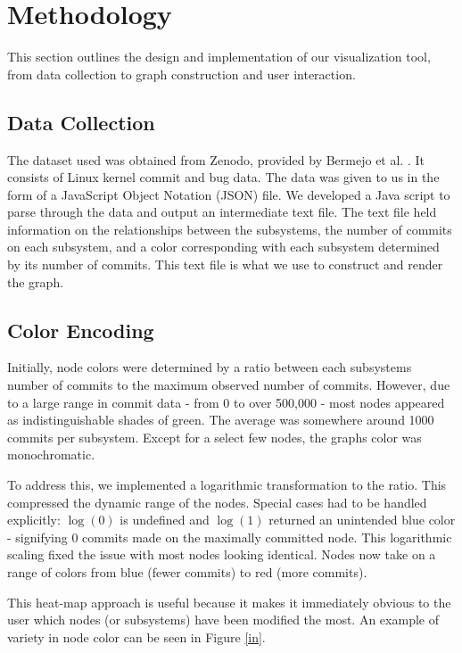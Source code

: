 \documentclass[conference]{IEEEtran}
\begin{document}
\section{Methodology}
\label{method}

This section outlines the design and implementation of our visualization tool, from data collection to graph construction and user interaction.

\subsection{Data Collection} 
The dataset used was obtained from Zenodo, provided by Bermejo et al. \cite{zenodo}. It consists of Linux kernel commit and bug data. The data was given to us in the form of a JavaScript Object Notation (JSON) file. We developed a Java script to parse through the data and output an intermediate text file. The text file held information on the relationships between the subsystems, the number of commits on each subsystem, and a color corresponding with each subsystem determined by its number of commits. This text file is what we use to construct and render the graph.

\subsection{Color Encoding}
\label{colE}
Initially, node colors were determined by a ratio between each subsystems number of commits to the maximum observed number of commits. However, due to a large range in commit data - from 0 to over 500,000 - most nodes appeared as indistinguishable shades of green. The average was somewhere around 1000 commits per subsystem. Except for a select few nodes, the graphs color was monochromatic.

To address this, we implemented a logarithmic transformation to the ratio. This compressed the dynamic range of the nodes. Special cases had to be handled explicitly: $\log(0)$ is undefined and $\log(1)$ returned an unintended blue color - signifying $0$ commits made on the maximally committed node. This logarithmic scaling fixed the issue with most nodes looking identical. Nodes now take on a range of colors from blue (fewer commits) to red (more commits).

 This heat-map approach is useful because it makes it immediately obvious to the user which nodes (or subsystems) have been modified the most. An example of variety in node color can be seen in Figure \ref{in}.
\end{document}
